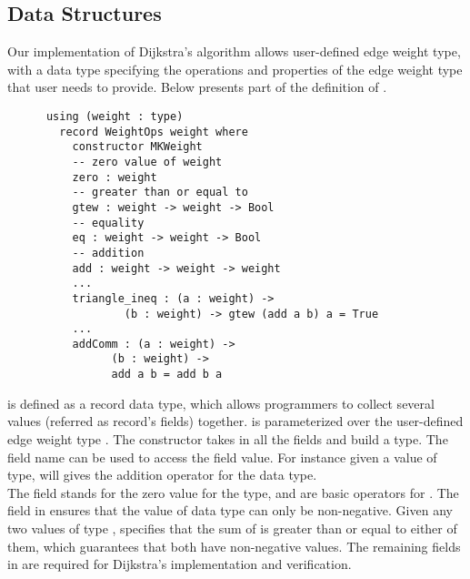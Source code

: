 \subsection{Data Structures}
Our implementation of Dijkstra's algorithm allows user-defined edge weight type, with a  data type specifying the operations and properties of the edge weight type that user needs to provide. Below presents part of the definition of . 
\begin{lstlisting}
      using (weight : type)
        record WeightOps weight where
          constructor MKWeight
          -- zero value of weight
          zero : weight
          -- greater than or equal to
          gtew : weight -> weight -> Bool
          -- equality
          eq : weight -> weight -> Bool
          -- addition
          add : weight -> weight -> weight
          ...
          triangle_ineq : (a : weight) -> 
                  (b : weight) -> gtew (add a b) a = True
          ...
          addComm : (a : weight) -> 
                (b : weight) -> 
                add a b = add b a
\end{lstlisting}

 is defined as a record data type, which allows programmers to collect several values (referred as record's fields) together.  is parameterized over the user-defined edge weight type . The  constructor takes in all the fields and build a  type. The field name can be used to access the field value. For instance given a value  of  type,  will gives the addition operator for the  data type. 
\\

The  field stands for the zero value for the  type, and  are basic operators for . The  field in  ensures that the value of  data type can only be non-negative. Given any two values  of type ,  specifies that the sum of  is greater than or equal to either of them, which guarantees that both  have non-negative values. The remaining fields in  are required for Dijkstra's implementation and verification. 
\\

